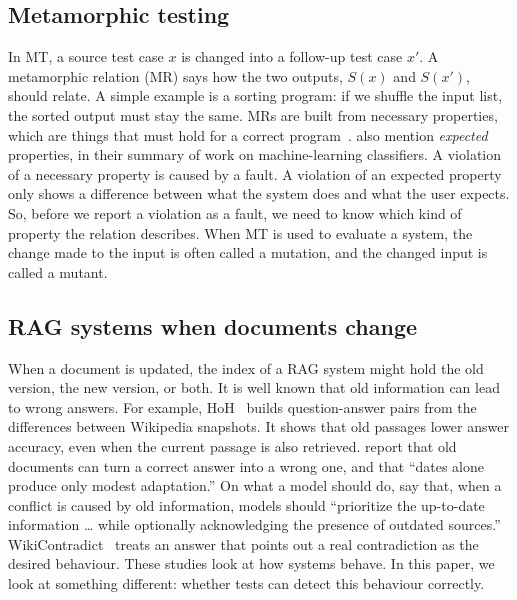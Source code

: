 \documentclass[preprint,12pt,authoryear]{elsarticle}
\begin{document}
\subsection{Metamorphic testing}
In MT, a source test case $x$ is changed into a follow-up test case $x'$. A metamorphic relation (MR)
says how the two outputs, $S(x)$ and $S(x')$, should relate. A simple example is a sorting program:
if we shuffle the input list, the sorted output must stay the same. MRs are built from necessary
properties, which are things that must hold for a correct program~\citep{segura2016survey}.
\citet{segura2016survey} also mention \emph{expected} properties, in their summary of work on
machine-learning classifiers. A violation of a necessary property is caused by a fault. A violation
of an expected property only shows a difference between what the system does and what the user
expects. So, before we report a violation as a fault, we need to know which kind of property the
relation describes. When MT is used to evaluate a system, the change made to the input is often
called a mutation, and the changed input is called a mutant.

\subsection{RAG systems when documents change}
When a document is updated, the index of a RAG system might hold the old version, the new version,
or both. It is well known that old information can lead to wrong answers. For example,
HoH~\citep{ouyang2025hoh} builds question-answer pairs from the differences between Wikipedia
snapshots. It shows that old passages lower answer accuracy, even when the current passage is also
retrieved. \citet{ahmed2026stale} report that old documents can turn a correct answer into a wrong
one, and that ``dates alone produce only modest adaptation.'' On what a model should do,
\citet{cattan2025dragged} say that, when a conflict is caused by old information, models should
``prioritize the up-to-date information \ldots{} while optionally acknowledging the presence of
outdated sources.'' WikiContradict~\citep{hou2024wikicontradict} treats an answer that points out a
real contradiction as the desired behaviour. These studies look at how systems behave. In this paper,
we look at something different: whether tests can detect this behaviour correctly.
\end{document}
